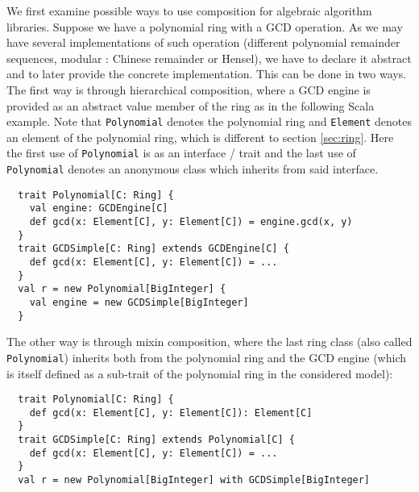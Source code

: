 \documentclass{llncs}
\newcommand{\code}[1]{\texttt{#1}}
\begin{document}
We first examine possible ways to use composition for algebraic algorithm
libraries. Suppose we have a polynomial ring with a GCD operation. As
we may have several implementations of such operation (different
polynomial remainder sequences, modular : Chinese remainder or
Hensel), we have to declare it abstract and to later provide the
concrete implementation. This can be done in two ways. The first way
is through hierarchical composition, where a GCD engine is provided as
an abstract value member of the ring as in the following Scala
example. Note that \code{Polynomial} denotes the polynomial ring and
\code{Element} denotes an element of the polynomial ring, which is
different to section \ref{sec:ring}.
Here the first use of \code{Poly\-nomial} is as an interface / trait
and the last use of \code{Poly\-nomial} denotes an anonymous class
which inherits from said interface.
%
\begin{verbatim}
  trait Polynomial[C: Ring] {
    val engine: GCDEngine[C]
    def gcd(x: Element[C], y: Element[C]) = engine.gcd(x, y)
  }
  trait GCDSimple[C: Ring] extends GCDEngine[C] {
    def gcd(x: Element[C], y: Element[C]) = ...
  }
  val r = new Polynomial[BigInteger] {
    val engine = new GCDSimple[BigInteger]
  }
\end{verbatim}
%
The other way is through mixin composition, where the last
ring class (also called \code{Polynomial}) inherits both from the
polynomial ring and the GCD engine (which is itself defined as a
sub-trait of the polynomial ring in the considered model):
\begin{verbatim}
  trait Polynomial[C: Ring] {
    def gcd(x: Element[C], y: Element[C]): Element[C]
  }
  trait GCDSimple[C: Ring] extends Polynomial[C] {
    def gcd(x: Element[C], y: Element[C]) = ...
  }
  val r = new Polynomial[BigInteger] with GCDSimple[BigInteger]
\end{verbatim}
\end{document}
